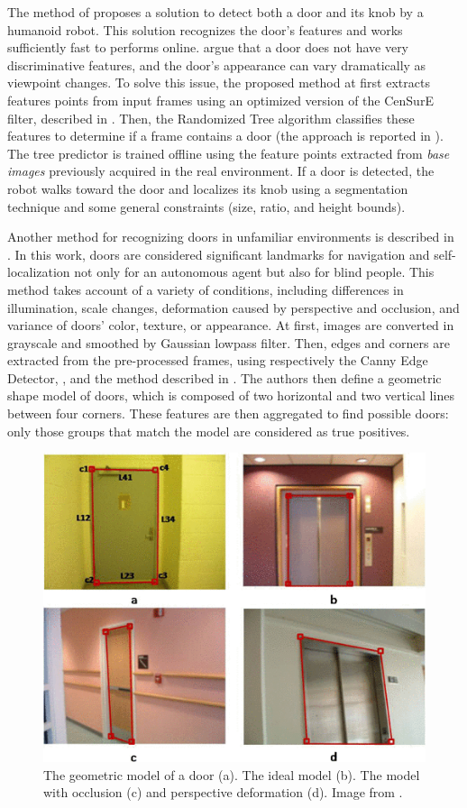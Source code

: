   The method of \cite{humanoid} proposes a solution to detect both a door and its knob by a humanoid robot. This solution recognizes the door's features and works sufficiently fast to performs online. \citeauthor{humanoid} \cite{humanoid} argue that a door does not have very discriminative features, and the door's appearance can vary dramatically as viewpoint changes. To solve this issue, the proposed method at first extracts features points from input frames using an optimized version of the CenSurE filter, described in \cite{censure}.  Then, the Randomized Tree algorithm classifies these features to determine if a frame contains a door (the approach is reported in \cite{treefeature}). The tree predictor is trained offline using the feature points extracted from \emph{base images} previously acquired in the real environment. If a door is detected, the robot walks toward the door and localizes its knob using a segmentation technique and some general constraints (size, ratio, and height bounds).
  
  Another method for recognizing doors in unfamiliar environments is described in \cite{edgeandcornerdoorsdetector}. In this work, doors are considered significant landmarks for navigation and self-localization not only for an autonomous agent but also for blind people. This method takes account of a variety of conditions, including differences in illumination, scale changes, deformation caused by perspective and occlusion, and variance of doors’ color, texture, or appearance.  
   At first, images are converted in grayscale and smoothed by Gaussian lowpass filter. Then, edges and corners are extracted from the pre-processed frames, using respectively the Canny Edge Detector, \cite{canny}, and the method described in \cite{cornerdetector}. The authors then define a geometric shape model of doors, which is composed of two horizontal and two vertical lines between four corners. These features are then aggregated to find possible doors: only those groups that match the model are considered as true positives.  
   
   \begin{figure}[h!]
   	\centering
   	\includegraphics[width=0.65\linewidth]{images/corner_door.png}
   	\caption{The geometric model of a door (a). The ideal model (b).   The model with occlusion (c) and perspective deformation (d). Image from \cite{cornerdetector}.}
   \end{figure}
 
